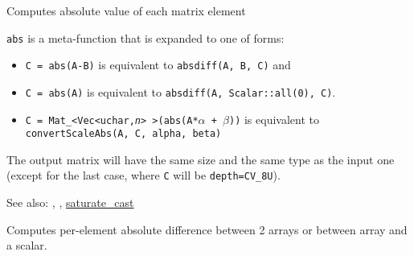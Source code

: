\ifCpp

Computes absolute value of each matrix element


\begin{description}
\end{description}

\texttt{abs} is a meta-function that is expanded to one of  forms:

\begin{itemize}
    \item \texttt{C = abs(A-B)} is equivalent to \texttt{absdiff(A, B, C)} and
    \item \texttt{C = abs(A)} is equivalent to \texttt{absdiff(A, Scalar::all(0), C)}.
    \item \texttt{C = Mat\_<Vec<uchar,\emph{n}> >(abs(A*$\alpha$ + $\beta$))} is equivalent to \texttt{convertScaleAbs(A, C, alpha, beta)}
\end{itemize}

The output matrix will have the same size and the same type as the input one
(except for the last case, where \texttt{C} will be \texttt{depth=CV\_8U}).

See also: , , \hyperref[cppfunc.saturatecast]{saturate\_cast}

Computes per-element absolute difference between 2 arrays or between array and a scalar.


\begin{description}
\end{description}

